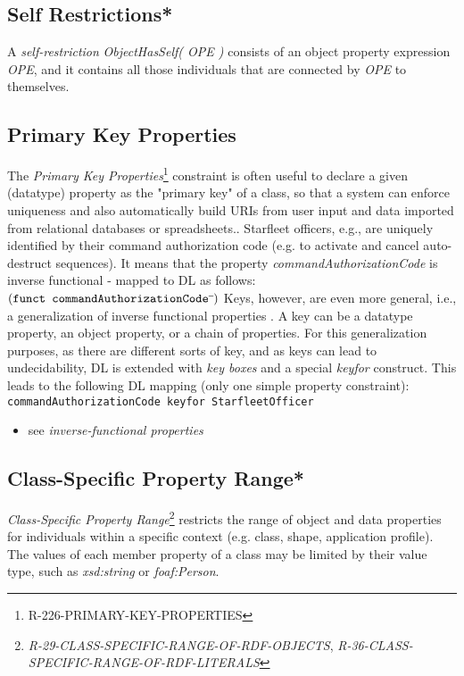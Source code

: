 \documentclass{llncs}
\newcommand{\ms}[1]{\texttt{#1}}
\begin{document}
\subsection{Self Restrictions*}

A \emph{self-restriction} \emph{ObjectHasSelf( OPE )} consists of an object property expression \emph{OPE}, and it contains all those individuals that are connected by \emph{OPE} to themselves. 

\subsection{Primary Key Properties}

The \emph{Primary Key Properties}\footnote{R-226-PRIMARY-KEY-PROPERTIES} constraint is often useful to declare a given (datatype) property as the "primary key" of a class, so that a system can enforce uniqueness and also automatically build URIs from user input and data imported from relational databases or spreadsheets.. 
Starfleet officers, e.g., are uniquely identified by their command authorization code (e.g. to activate and cancel auto-destruct sequences).
It means that the property \emph{commandAuthorizationCode} is inverse functional - mapped to DL as follows:
$(\ms{funct commandAuthorizationCode}\sp{\overline{\ }})$
Keys, however, are even more general, i.e., a generalization of inverse functional properties \cite{Schneider2009}.
A key can be a datatype property, an object property, or a chain of properties.
For this generalization purposes, as there are different sorts of key, and as keys can lead to undecidability, 
DL is extended with \emph{key boxes} and a special \emph{keyfor} construct\cite{Lutz2005}.
This leads to the following DL mapping (only one simple property constraint):
\ms{commandAuthorizationCode \ms{keyfor} StarfleetOfficer}

\begin{itemize}
	\item see \emph{inverse-functional properties}
\end{itemize}

\subsection{Class-Specific Property Range*}		

{\em Class-Specific Property Range}\footnote{{\em R-29-CLASS-SPECIFIC-RANGE-OF-RDF-OBJECTS}, {\em R-36-CLASS-SPECIFIC-RANGE-OF-RDF-LITERALS}} restricts the range of object and data properties for individuals within a specific context (e.g. class, shape, application profile).
The values of each member property of a class may be limited by their value type, such as \emph{xsd:string} or \emph{foaf:Person}. 
\end{document}
